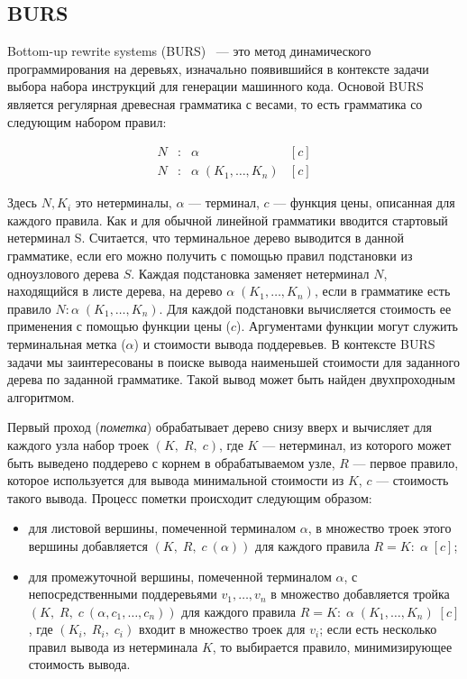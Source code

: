 \subsection{BURS}

Bottom-up rewrite systems (BURS)~\cite{burs} --- это метод динамического
программирования на деревьях, изначально появившийся в контексте задачи выбора
набора инструкций для генерации машинного кода. Основой BURS является
регулярная древесная грамматика с весами, то есть грамматика со следующим
набором правил: 

$$
\begin{array}{rcll}
  N &:& \alpha& [c]\\
  N &:& \alpha\; (K_1,\dots,K_n)& [c]
\end{array}
$$

Здесь $N, K_i$ это нетерминалы, $\alpha$ --- терминал,
$c$ --- функция цены, описанная для каждого правила.
Как и для обычной линейной грамматики вводится стартовый
нетерминал S. Считается, что терминальное дерево выводится в
данной грамматике, если его можно получить с помощью правил
подстановки из одноузлового дерева $S$.
Каждая подстановка заменяет нетерминал $N$, находящийся в листе дерева, на дерево 
$\alpha\;(K_1,\dots,K_n)$, если в грамматике есть правило
$N:\alpha\;(K_1,\dots,K_n)$. 
Для каждой подстановки вычисляется стоимость ее применения с помощью
функции цены ($c$).
Аргументами функции могут служить терминальная метка ($\alpha$) и стоимости
вывода поддеревьев.
В контексте BURS задачи мы заинтересованы в поиске вывода наименьшей стоимости
для заданного дерева по заданной грамматике.
Такой вывод может быть найден двухпроходным алгоритмом.

Первый проход (\emph{пометка}) обрабатывает дерево снизу вверх и вычисляет
для каждого узла набор троек $(K,\;R,\;c)$, где $K$ --- нетерминал, из которого может быть
выведено поддерево с корнем в обрабатываемом узле,
$R$ --- первое правило, которое используется для вывода минимальной стоимости из $K$,
$c$ --- стоимость такого вывода.
Процесс пометки происходит следующим образом:

\begin{itemize}
\item для листовой вершины, помеченной терминалом $\alpha$, в множество троек
этого вершины добавляется $(K,\;R,\;c\:(\alpha))$ для каждого правила $R=K:\;\alpha\;[c]$;
\item для промежуточной вершины, помеченной терминалом $\alpha$,
с непосредственными поддеревьями $v_1,\dots,v_n$
в множество добавляется тройка $(K,\;R,\;c\:(\alpha,c_1,\dots,c_n))$ для каждого правила
$R=K:\;\alpha\;(K_1,\dots,K_n)\;[c]$, где $(K_i,\;R_i,\;c_i)$ входит в множество троек для
$v_i$; если есть несколько правил вывода из нетерминала $K$, то выбирается правило,
минимизирующее стоимость вывода.
\end{itemize}

